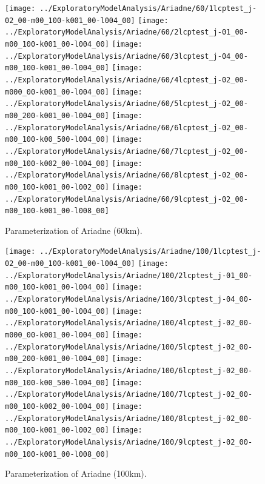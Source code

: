 \documentclass[12pt,a4paper]{thesis}
\begin{document}
{\begin{appendices}
\begin{figure}
\centering
\texttt{[image: ../ExploratoryModelAnalysis/Ariadne/60/1lcptest\_j-02\_00-m00\_100-k001\_00-l004\_00]}
\texttt{[image: ../ExploratoryModelAnalysis/Ariadne/60/2lcptest\_j-01\_00-m00\_100-k001\_00-l004\_00]}
\texttt{[image: ../ExploratoryModelAnalysis/Ariadne/60/3lcptest\_j-04\_00-m00\_100-k001\_00-l004\_00]}
\texttt{[image: ../ExploratoryModelAnalysis/Ariadne/60/4lcptest\_j-02\_00-m000\_00-k001\_00-l004\_00]}
\texttt{[image: ../ExploratoryModelAnalysis/Ariadne/60/5lcptest\_j-02\_00-m00\_200-k001\_00-l004\_00]}
\texttt{[image: ../ExploratoryModelAnalysis/Ariadne/60/6lcptest\_j-02\_00-m00\_100-k00\_500-l004\_00]}
\texttt{[image: ../ExploratoryModelAnalysis/Ariadne/60/7lcptest\_j-02\_00-m00\_100-k002\_00-l004\_00]}
\texttt{[image: ../ExploratoryModelAnalysis/Ariadne/60/8lcptest\_j-02\_00-m00\_100-k001\_00-l002\_00]}
\texttt{[image: ../ExploratoryModelAnalysis/Ariadne/60/9lcptest\_j-02\_00-m00\_100-k001\_00-l008\_00]}
\caption{Parameterization of Ariadne (60km).}
\label{fig:60kmAll}
\end{figure}

\begin{figure}
\centering
\texttt{[image: ../ExploratoryModelAnalysis/Ariadne/100/1lcptest\_j-02\_00-m00\_100-k001\_00-l004\_00]}
\texttt{[image: ../ExploratoryModelAnalysis/Ariadne/100/2lcptest\_j-01\_00-m00\_100-k001\_00-l004\_00]}
\texttt{[image: ../ExploratoryModelAnalysis/Ariadne/100/3lcptest\_j-04\_00-m00\_100-k001\_00-l004\_00]}
\texttt{[image: ../ExploratoryModelAnalysis/Ariadne/100/4lcptest\_j-02\_00-m000\_00-k001\_00-l004\_00]}
\texttt{[image: ../ExploratoryModelAnalysis/Ariadne/100/5lcptest\_j-02\_00-m00\_200-k001\_00-l004\_00]}
\texttt{[image: ../ExploratoryModelAnalysis/Ariadne/100/6lcptest\_j-02\_00-m00\_100-k00\_500-l004\_00]}
\texttt{[image: ../ExploratoryModelAnalysis/Ariadne/100/7lcptest\_j-02\_00-m00\_100-k002\_00-l004\_00]}
\texttt{[image: ../ExploratoryModelAnalysis/Ariadne/100/8lcptest\_j-02\_00-m00\_100-k001\_00-l002\_00]}
\texttt{[image: ../ExploratoryModelAnalysis/Ariadne/100/9lcptest\_j-02\_00-m00\_100-k001\_00-l008\_00]}
\caption{Parameterization of Ariadne (100km).}
\label{fig:100kmAll}
\end{figure}


\end{appendices}}
\end{document}
